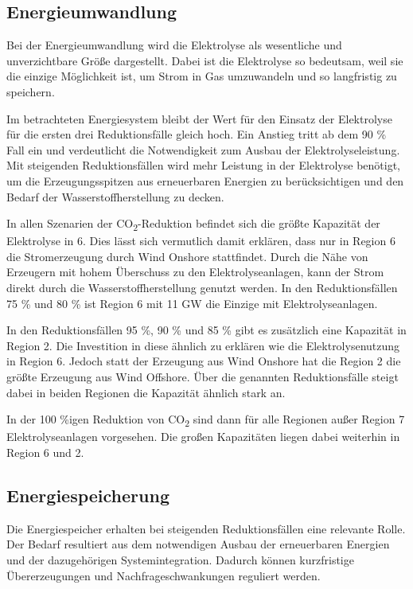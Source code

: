 \subsection{Energieumwandlung}
Bei der Energieumwandlung wird die Elektrolyse als wesentliche und unverzichtbare Größe dargestellt. Dabei ist die Elektrolyse so bedeutsam, weil sie die einzige Möglichkeit ist, um Strom in Gas umzuwandeln und so langfristig zu speichern.

Im betrachteten Energiesystem bleibt der Wert für den Einsatz der Elektrolyse für die ersten drei Reduktionsfälle gleich hoch. Ein Anstieg tritt ab dem 90 \% Fall ein und verdeutlicht die Notwendigkeit zum Ausbau der Elektrolyseleistung. Mit steigenden Reduktionsfällen wird mehr Leistung in der Elektrolyse benötigt, um die Erzeugungsspitzen aus erneuerbaren Energien zu berücksichtigen und den Bedarf der Wasserstoffherstellung zu decken. 


In allen Szenarien der CO\textsubscript{2}-Reduktion befindet sich die größte Kapazität der Elektrolyse in 6. Dies lässt sich vermutlich damit erklären, dass nur in Region 6 die Stromerzeugung durch Wind Onshore stattfindet. Durch die Nähe von Erzeugern mit hohem Überschuss zu den Elektrolyseanlagen, kann der Strom direkt durch die Wasserstoffherstellung genutzt werden. In den Reduktionsfällen 75 \% und 80 \% ist Region 6 mit 11 GW die Einzige mit Elektrolyseanlagen.

In den Reduktionsfällen 95 \%, 90 \% und 85 \% gibt es zusätzlich eine Kapazität in Region 2. Die Investition in diese ähnlich zu erklären wie die Elektrolysenutzung in Region 6. Jedoch statt der Erzeugung aus Wind Onshore hat die Region 2 die größte Erzeugung aus Wind Offshore.
Über die genannten Reduktionsfälle steigt dabei in beiden Regionen die Kapazität ähnlich stark an. 

In der 100 \%igen Reduktion von CO\textsubscript{2} sind dann für alle Regionen außer Region 7 Elektrolyseanlagen vorgesehen. Die großen Kapazitäten liegen dabei weiterhin in Region 6 und 2.

\subsection{Energiespeicherung}
Die Energiespeicher erhalten bei steigenden Reduktionsfällen eine relevante Rolle. Der Bedarf resultiert aus dem notwendigen Ausbau der erneuerbaren Energien und der dazugehörigen Systemintegration. 
Dadurch können kurzfristige Übererzeugungen und Nachfrageschwankungen reguliert werden. 

